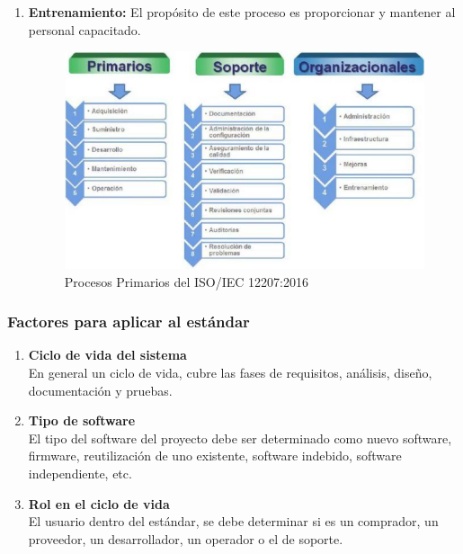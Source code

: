 \documentclass{article}
\begin{document}
\begin{enumerate}
\begin{enumerate}
            \item \textbf{Entrenamiento: }El propósito de este
            proceso es proporcionar y mantener al personal capacitado.

            \begin{figure}[pbth]
                \centering
                \includegraphics[scale=.37]{caracteristicas2.png}
                \caption{Procesos Primarios del ISO/IEC 12207:2016}
            \end{figure}

        \end{enumerate}

\subsubsection{Factores para aplicar al estándar}

        \begin{enumerate}
            \item \textbf{Ciclo de vida del sistema}\\
                En general un ciclo de vida, cubre las fases de
                requisitos, análisis, diseño, documentación y pruebas.

            \item \textbf{Tipo de software}\\
                El tipo del software del proyecto debe ser
                determinado como nuevo software, firmware, reutilización de uno
                existente, software indebido, software independiente, etc.
            
            \item \textbf{Rol en el ciclo de vida}\\
                El usuario dentro del estándar, se debe
                determinar si es un comprador, un proveedor, un desarrollador,
                un operador o el de soporte.


\end{enumerate}
\end{enumerate}
\end{document}
